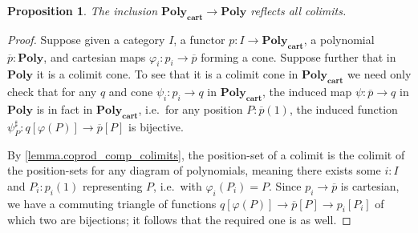 \documentclass[11pt, one side, article]{memoir}
\theoremstyle{definition}
\theoremstyle{plain}
\newtheorem{proposition}[definitionx]{Proposition}
\newcommand{\Cat}[1]{\mathbf{#1}}%
\newcommand{\ol}[1]{\overline{#1}}
\newcommand{\poly}{\Cat{Poly}}
\newcommand{\polycart}{\poly_\Cat{cart}}
\begin{document}
\begin{proposition}\label{prop.polycart_reflect}
The inclusion $\polycart\to\poly$ reflects all colimits.
\end{proposition}
\begin{proof}
Suppose given a category $I$, a functor $p\colon I\to\polycart$, a polynomial $\ol{p}:\poly$, and cartesian maps $\varphi_i\colon p_i\to \ol{p}$ forming a cone. Suppose further that in $\poly$ it is a colimit cone. To see that it is a colimit cone in $\polycart$ we need only check that for any $q$ and cone $\psi_i\colon p_i\to q$ in $\polycart$, the induced map $\psi\colon\ol{p}\to q$ in $\poly$ is in fact in $\polycart$, i.e.\ for any position $P:\ol{p}(1)$, the induced function $\psi^\sharp_P\colon q[\varphi(P)]\to\ol{p}[P]$ is bijective. 

By \cref{lemma.coprod_comp_colimits}, the position-set of a colimit is the colimit of the position-sets for any diagram of polynomials, meaning there exists some $i:I$ and $P_i:p_i(1)$ representing $P$, i.e.\ with $\varphi_i(P_i)=P$. Since $p_i\to\ol{p}$ is cartesian, we have a commuting triangle of functions $q[\varphi(P)]\to\ol{p}[P]\to p_i[P_i]$ of which two are bijections; it follows that the required one is as well.
\end{proof}
\end{document}
